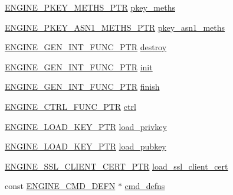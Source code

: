 \begin{DoxyCompactItemize}
\item 
\hyperlink{include_2openssl_2engine_8h_aa7fedffacd774d280cea8718e6286b4a}{E\+N\+G\+I\+N\+E\+\_\+\+P\+K\+E\+Y\+\_\+\+M\+E\+T\+H\+S\+\_\+\+P\+TR} \hyperlink{structengine__st_a1e21c8dc3bc1be69da66ed44fde7ec61}{pkey\+\_\+meths}
\item 
\hyperlink{include_2openssl_2engine_8h_aadeacf22cd4ddbb866e93116ef43ddd1}{E\+N\+G\+I\+N\+E\+\_\+\+P\+K\+E\+Y\+\_\+\+A\+S\+N1\+\_\+\+M\+E\+T\+H\+S\+\_\+\+P\+TR} \hyperlink{structengine__st_a1145b67fb00d87995e4ee7cb17448900}{pkey\+\_\+asn1\+\_\+meths}
\item 
\hyperlink{include_2openssl_2engine_8h_a84d9db7bf0679f420b08bb84818b3a5d}{E\+N\+G\+I\+N\+E\+\_\+\+G\+E\+N\+\_\+\+I\+N\+T\+\_\+\+F\+U\+N\+C\+\_\+\+P\+TR} \hyperlink{structengine__st_a5b808052bbcb3c38e132c40e61a23ea2}{destroy}
\item 
\hyperlink{include_2openssl_2engine_8h_a84d9db7bf0679f420b08bb84818b3a5d}{E\+N\+G\+I\+N\+E\+\_\+\+G\+E\+N\+\_\+\+I\+N\+T\+\_\+\+F\+U\+N\+C\+\_\+\+P\+TR} \hyperlink{structengine__st_a2e21d932f89084ff414a1230be687557}{init}
\item 
\hyperlink{include_2openssl_2engine_8h_a84d9db7bf0679f420b08bb84818b3a5d}{E\+N\+G\+I\+N\+E\+\_\+\+G\+E\+N\+\_\+\+I\+N\+T\+\_\+\+F\+U\+N\+C\+\_\+\+P\+TR} \hyperlink{structengine__st_a379a01f9bb776458c4811bfc1ffe643f}{finish}
\item 
\hyperlink{include_2openssl_2engine_8h_ab655503d1fce24d89928d205bbe91466}{E\+N\+G\+I\+N\+E\+\_\+\+C\+T\+R\+L\+\_\+\+F\+U\+N\+C\+\_\+\+P\+TR} \hyperlink{structengine__st_aaa05504716b9c1108e61de4c891d76df}{ctrl}
\item 
\hyperlink{include_2openssl_2engine_8h_aff932899f73a37498864cfd69f99cfd8}{E\+N\+G\+I\+N\+E\+\_\+\+L\+O\+A\+D\+\_\+\+K\+E\+Y\+\_\+\+P\+TR} \hyperlink{structengine__st_af7f789e1432a4004768a1804198b0d8c}{load\+\_\+privkey}
\item 
\hyperlink{include_2openssl_2engine_8h_aff932899f73a37498864cfd69f99cfd8}{E\+N\+G\+I\+N\+E\+\_\+\+L\+O\+A\+D\+\_\+\+K\+E\+Y\+\_\+\+P\+TR} \hyperlink{structengine__st_ab3f26bfe357c673e3fdf751ea7a79c35}{load\+\_\+pubkey}
\item 
\hyperlink{include_2openssl_2engine_8h_a1ff78fa9a52375dcf4c4d8de8a2cf7ed}{E\+N\+G\+I\+N\+E\+\_\+\+S\+S\+L\+\_\+\+C\+L\+I\+E\+N\+T\+\_\+\+C\+E\+R\+T\+\_\+\+P\+TR} \hyperlink{structengine__st_ae1f1240d9536dd9d29da9c1c4143dda2}{load\+\_\+ssl\+\_\+client\+\_\+cert}
\item 
const \hyperlink{crypto_2engine_2engine_8h_aa118b1a0ff2bdb434f2fa700c6db6b74}{E\+N\+G\+I\+N\+E\+\_\+\+C\+M\+D\+\_\+\+D\+E\+FN} $\ast$ \hyperlink{structengine__st_a51557038eef4ba8431f9c56576400e91}{cmd\+\_\+defns}

\end{DoxyCompactItemize}
